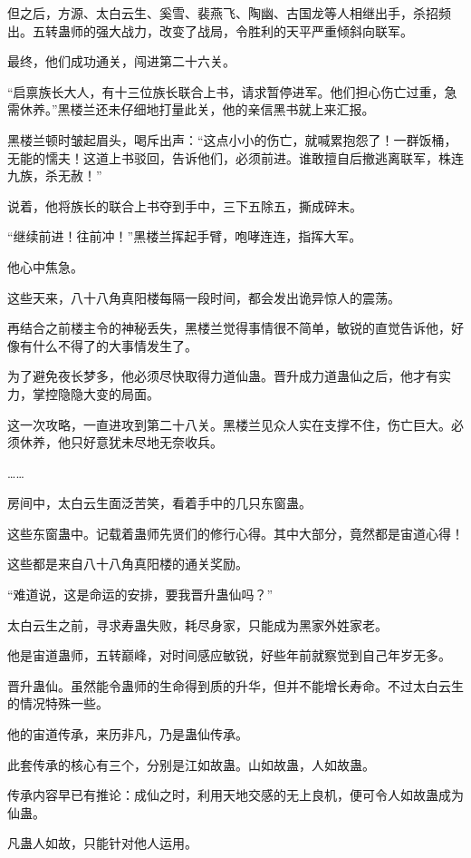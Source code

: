 \begin{this_body}
但之后，方源、太白云生、奚雪、裴燕飞、陶幽、古国龙等人相继出手，杀招频出。五转蛊师的强大战力，改变了战局，令胜利的天平严重倾斜向联军。

最终，他们成功通关，闯进第二十六关。

“启禀族长大人，有十三位族长联合上书，请求暂停进军。他们担心伤亡过重，急需休养。”黑楼兰还未仔细地打量此关，他的亲信黑书就上来汇报。

黑楼兰顿时皱起眉头，喝斥出声：“这点小小的伤亡，就喊累抱怨了！一群饭桶，无能的懦夫！这道上书驳回，告诉他们，必须前进。谁敢擅自后撤逃离联军，株连九族，杀无赦！”

说着，他将族长的联合上书夺到手中，三下五除五，撕成碎末。

“继续前进！往前冲！”黑楼兰挥起手臂，咆哮连连，指挥大军。

他心中焦急。

这些天来，八十八角真阳楼每隔一段时间，都会发出诡异惊人的震荡。

再结合之前楼主令的神秘丢失，黑楼兰觉得事情很不简单，敏锐的直觉告诉他，好像有什么不得了的大事情发生了。

为了避免夜长梦多，他必须尽快取得力道仙蛊。晋升成力道蛊仙之后，他才有实力，掌控隐隐大变的局面。

这一次攻略，一直进攻到第二十八关。黑楼兰见众人实在支撑不住，伤亡巨大。必须休养，他只好意犹未尽地无奈收兵。

……

房间中，太白云生面泛苦笑，看着手中的几只东窗蛊。

这些东窗蛊中。记载着蛊师先贤们的修行心得。其中大部分，竟然都是宙道心得！

这些都是来自八十八角真阳楼的通关奖励。

“难道说，这是命运的安排，要我晋升蛊仙吗？”

太白云生之前，寻求寿蛊失败，耗尽身家，只能成为黑家外姓家老。

他是宙道蛊师，五转巅峰，对时间感应敏锐，好些年前就察觉到自己年岁无多。

晋升蛊仙。虽然能令蛊师的生命得到质的升华，但并不能增长寿命。不过太白云生的情况特殊一些。

他的宙道传承，来历非凡，乃是蛊仙传承。

此套传承的核心有三个，分别是江如故蛊。山如故蛊，人如故蛊。

传承内容早已有推论：成仙之时，利用天地交感的无上良机，便可令人如故蛊成为仙蛊。

凡蛊人如故，只能针对他人运用。


\end{this_body}
